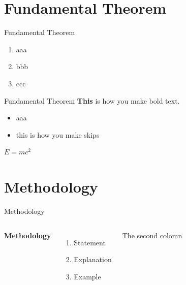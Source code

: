 \documentclass[9pt,aspectratio=169]{beamer}
\begin{document}
\section{Fundamental Theorem}
\begin{frame}{Fundamental Theorem}
\begin{enumerate}
    \item aaa
    \item bbb
    \item ccc
\end{enumerate}
    
\end{frame}

\begin{frame}{Fundamental Theorem}
  \textbf{This} is how you make bold text.
  \medskip

  \begin{itemize}
      \item aaa
      \medskip
      \item this is how you make skips
  \end{itemize}    
  \medskip

  \begin{theorem}
    $E = mc^2$
  \end{theorem}

\end{frame}

\section{Methodology}
\begin{frame}{Methodology}
  \begin{columns}[c] %

      \textbf{Methodology}
      \begin{enumerate}
        \item Statement
        \item Explanation
        \item Example
      \end{enumerate}

      The second colomn

  \end{columns}
\end{frame}
\end{document}

